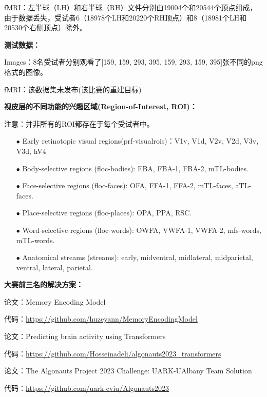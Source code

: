 \documentclass[12pt, a4paper, oneside]{ctexart}
\begin{document}
    fMRI：左半球（LH）和右半球（RH）文件分别由19004个和20544个顶点组成，由于数据丢失，受试者6（18978个LH和20220个RH顶点）和8（18981个LH和20530个右侧顶点）除外。

    \noindent\textbf{测试数据：}

    Images：8名受试者分别观看了[159, 159, 293, 395, 159, 293, 159, 395]张不同的png格式的图像。

    fMRI：该数据集未发布(该比赛的重建目标)

    \noindent\textbf{视皮层的不同功能的兴趣区域(Region-of-Interest, ROI)：}

    注意：并非所有的ROI都存在于每个受试者中。

    \begin{itemize}
        \item[$\bullet$]Early retinotopic visual regions(prf-visualrois)：V1v, V1d, V2v, V2d, V3v, V3d, hV4
        \item[$\bullet$]Body-selective regions (floc-bodies): EBA, FBA-1, FBA-2, mTL-bodies.
        \item[$\bullet$]Face-selective regions (floc-faces): OFA, FFA-1, FFA-2, mTL-faces, aTL-faces.
        \item[$\bullet$]Place-selective regions (floc-places): OPA, PPA, RSC.
        \item[$\bullet$]Word-selective regions (floc-words): OWFA, VWFA-1, VWFA-2, mfs-words, mTL-words.
        \item[$\bullet$]Anatomical streams (streams): early, midventral, midlateral, midparietal, ventral, lateral, parietal.
    \end{itemize}
    \noindent\textbf{大赛前三名的解决方案：}

    论文：Memory Encoding Model\cite{yang2023memory}

    代码：\url{https://github.com/huzeyann/MemoryEncodingModel}


    论文：Predicting brain activity using Transformers\cite{Adeli2023.08.02.551743}

    代码：\url{https://github.com/Hosseinadeli/algonauts2023_transformers}


    论文：The Algonauts Project 2023 Challenge: UARK-UAlbany Team Solution\cite{nguyen2023algonauts}

    代码：\url{https://github.com/uark-cviu/Algonauts2023}
\end{document}
